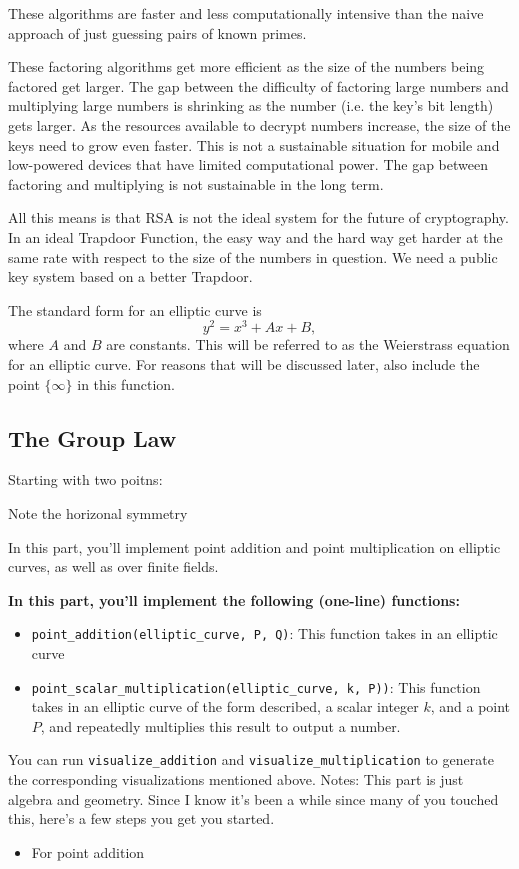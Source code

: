 \documentclass{article}
\begin{document}
These algorithms are faster and less computationally intensive than the naive approach of just guessing pairs of known primes.

These factoring algorithms get more efficient as the size of the numbers being factored get larger. The gap between the difficulty of factoring large numbers and multiplying large numbers is shrinking as the number (i.e. the key's bit length) gets larger. As the resources available to decrypt numbers increase, the size of the keys need to grow even faster. This is not a sustainable situation for mobile and low-powered devices that have limited computational power. The gap between factoring and multiplying is not sustainable in the long term.

All this means is that RSA is not the ideal system for the future of cryptography. In an ideal Trapdoor Function, the easy way and the hard way get harder at the same rate with respect to the size of the numbers in question. We need a public key system based on a better Trapdoor.



The standard form for an elliptic curve is $$y^{2} = x^{3} + Ax + B,$$ where $A$ and $B$ are constants.  This will be referred to as the Weierstrass
equation for an elliptic curve. For reasons that will be discussed later, also include the point $\{\infty\}$ in this function.

\subsection*{The Group Law}
    Starting with two poitns: 


    Note the horizonal symmetry


\begin{tcolorbox}
    In this part, you'll implement point addition and point multiplication on elliptic curves, as well as over finite fields.

    
    \textbf{In this part, you'll implement the following (one-line) functions:}
    \begin{itemize}
        \item \lstinline{point_addition(elliptic_curve, P, Q)}: This function takes in an elliptic curve 
        \item \lstinline{point_scalar_multiplication(elliptic_curve, k, P))}: This function takes in an elliptic curve of the form described, a scalar integer $k$, and a point $P$, and repeatedly multiplies this result to output a number.
    \end{itemize}
    You can run \lstinline{visualize_addition} and \lstinline{visualize_multiplication} to generate the corresponding visualizations mentioned above. 
    Notes: This part is just algebra and geometry. Since I know it's been a while since many of you touched this, here's a few steps you get you started.
    \begin{itemize}
        \item For point addition
    \end{itemize}
    
\end{tcolorbox}
\end{document}
